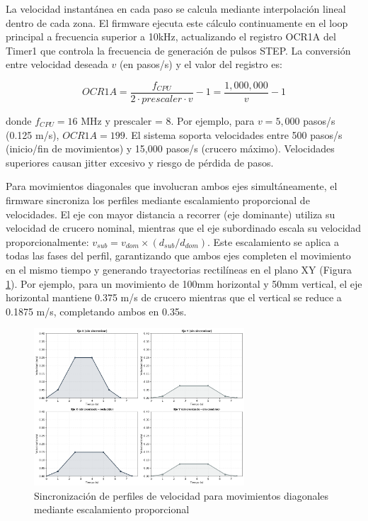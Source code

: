 La velocidad instantánea en cada paso se calcula mediante interpolación lineal dentro de cada zona. El firmware ejecuta este cálculo continuamente en el loop principal a frecuencia superior a 10kHz, actualizando el registro OCR1A del Timer1 que controla la frecuencia de generación de pulsos STEP. La conversión entre velocidad deseada $v$ (en pasos/s) y el valor del registro es:

\begin{equation}
OCR1A = \frac{f_{CPU}}{2 \cdot prescaler \cdot v} - 1 = \frac{1,000,000}{v} - 1
\end{equation}

donde $f_{CPU} = 16$ MHz y prescaler = 8. Por ejemplo, para $v = 5,000$ pasos/s (0.125 m/s), $OCR1A = 199$. El sistema soporta velocidades entre 500 pasos/s (inicio/fin de movimientos) y 15,000 pasos/s (crucero máximo). Velocidades superiores causan jitter excesivo y riesgo de pérdida de pasos.

Para movimientos diagonales que involucran ambos ejes simultáneamente, el firmware sincroniza los perfiles mediante escalamiento proporcional de velocidades. El eje con mayor distancia a recorrer (eje dominante) utiliza su velocidad de crucero nominal, mientras que el eje subordinado escala su velocidad proporcionalmente: $v_{sub} = v_{dom} \times (d_{sub}/d_{dom})$. Este escalamiento se aplica a todas las fases del perfil, garantizando que ambos ejes completen el movimiento en el mismo tiempo y generando trayectorias rectilíneas en el plano XY (Figura \ref{fig:sincronizacion_multieje}). Por ejemplo, para un movimiento de 100mm horizontal y 50mm vertical, el eje horizontal mantiene 0.375 m/s de crucero mientras que el vertical se reduce a 0.1875 m/s, completando ambos en 0.35s.

\begin{figure}[H]
    \centering
    \includegraphics[width=0.7\textwidth]{imagenes/sincronizacion_multieje.png}
    \caption{Sincronización de perfiles de velocidad para movimientos diagonales mediante escalamiento proporcional}
    \label{fig:sincronizacion_multieje}
\end{figure}
